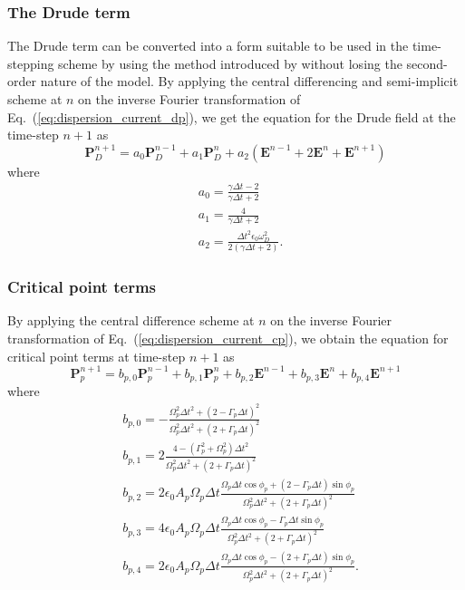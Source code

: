 \subsubsection{The Drude term}
\label{sec:ade_dp}
The Drude term can be converted into a form suitable to be used in the time-stepping scheme by using the method introduced by \citet{okoniewski_drude_2006} without losing the second-order nature of the model. By applying the central differencing and semi-implicit scheme at $n$ on the inverse Fourier transformation of Eq.~(\ref{eq:dispersion_current_dp}), we get the equation for the Drude field at the time-step $n+1$ as
\begin{equation}
\mathbf{P}_D^{n+1} = a_0 \mathbf{P}_D^{n-1} + a_1 \mathbf{P}_D^n + a_2 \left( \mathbf{E}^{n-1} + 2 \mathbf{E}^n + \mathbf{E}^{n+1} \right)
\label{eq:dispersion_current_dp_n}
\end{equation}
where 
\begin{equation}
\begin{split}
&a_0 = \frac{\gamma \Delta t - 2}{\gamma \Delta t + 2}\\
&a_1 = \frac{4}{\gamma \Delta t + 2}\\
&a_2 = \frac{\Delta t^2 \epsilon_0 \omega_D^2}{2 (\gamma \Delta t + 2)}.
\end{split}
\end{equation}

\subsubsection{Critical point terms}
\label{sec:ade_cp}
By applying the central difference scheme at $n$ on the inverse Fourier transformation of Eq.~(\ref{eq:dispersion_current_cp}), we obtain the equation for critical point terms at time-step $n+1$ as
\begin{equation}
\mathbf{P}_p^{n+1} = b_{p,0} \mathbf{P}_p^{n-1} + b_{p,1} \mathbf{P}_p^n + b_{p,2} \mathbf{E}^{n-1} +  b_{p,3} \mathbf{E}^{n} + b_{p,4} \mathbf{E}^{n+1}
\label{eq:dispersion_current_cp_n}
\end{equation}
where
\begin{equation}
\begin{split}
&b_{p,0} = - \frac{\Omega_p^2 \Delta t^2 + (2 - \Gamma_p \Delta t)^2}{\Omega_p^2 \Delta t^2 + (2 + \Gamma_p \Delta t)^2}\\
&b_{p,1} = 2 \frac{4 - (\Gamma_p^2 + \Omega_p^2) \Delta t^2}{\Omega_p^2 \Delta t^2 + (2 + \Gamma_p \Delta t)^2}\\
&b_{p,2} = 2 \epsilon_0 A_p \Omega_p \Delta t \frac{\Omega_p \Delta t \cos \phi_p + (2 - \Gamma_p \Delta t) \sin \phi_p}{\Omega_p^2 \Delta t^2 + (2 + \Gamma_p \Delta t)^2}\\
&b_{p,3} = 4 \epsilon_0 A_p \Omega_p \Delta t \frac{\Omega_p \Delta t \cos \phi_p - \Gamma_p \Delta t \sin \phi_p}{\Omega_p^2 \Delta t^2 + (2 + \Gamma_p \Delta t)^2}\\
&b_{p,4} = 2 \epsilon_0 A_p \Omega_p \Delta t \frac{\Omega_p \Delta t \cos \phi_p - (2 + \Gamma_p \Delta t) \sin \phi_p}{\Omega_p^2 \Delta t^2 + (2 + \Gamma_p \Delta t)^2}.
\end{split}
\end{equation}

